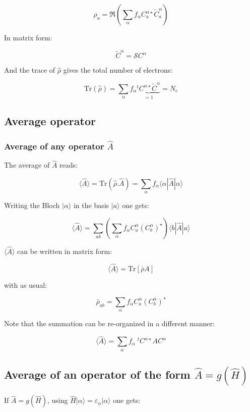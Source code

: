 \documentclass{article}
\newcommand{\bra}[1]{\langle #1|}
\newcommand{\ket}[1]{|#1\rangle}
\newcommand{\op}[1]{\hat{#1}}
\begin{document}
\[\displaystyle \rho_{a}= \Re \left( \sum_{\alpha} f_{\alpha} C_{a}^{\alpha \star}\widetilde{C}_{a}^{\alpha }
 \right)\]

\noindent
In matrix form:

\[ \widetilde{C}^{\alpha}=\mathcal{S}C^{\alpha} \]

\noindent
And the trace of $\op{\rho}$ gives the total number of electrons:

\[ \mbox{Tr} (\op{\rho })= \sum_{\alpha } f_{\alpha}
\underbrace{^tC^{\alpha \star}\widetilde{C}^{\alpha}}_{=1} =N_e\]

\subsection{Average operator}


\subsubsection{Average of any operator $\op{A}$}


\noindent The average of $\op{A}$ reads:

\[ \langle \op{A} \rangle =\mbox{Tr} (\op{\rho}.\op{A})=\sum_{\alpha}f_{\alpha}
\bra{\alpha}\op{A}\ket{\alpha}\]

\noindent
Writing the Bloch $\ket{\alpha}$ in the basis $\ket{a}$ one gets:


\[ \displaystyle  \langle\op{A}\rangle=  \sum_{a  b} 
\left( \sum_{\alpha}  f_{\alpha}
C_{a }^{\alpha}(C_{b}^{\alpha})^{\star} \right)   
\bra{ b } \op{A} \ket{a} \]


\noindent
$\langle\op{A}  \rangle$ can be written in matrix form:

\[  \langle\op{A}  \rangle= \text{Tr} \left[\bar{\rho}A\right] \]

\noindent
with as usual:

\[ \bar{\rho}_{a b}=  \sum_{\alpha}  f_{\alpha} C_{a }^{\alpha}(C_{b}^{\alpha})^{\star}    \]

\noindent
Note that the summation can be re-organized in a different manner:

\[\langle\op{A}  \rangle=\sum_{\alpha} f_{\alpha} \; ^tC^{\alpha \star} A C^{\alpha} \]

\subsection{Average of an operator of the form $\op{A}=g(\op{H})$}

\noindent
If $\op{A}=g(\op{H})$, using
$\op{H}\ket{\alpha}=\varepsilon_{\alpha}\ket{\alpha}$ 
one gets:
\end{document}
